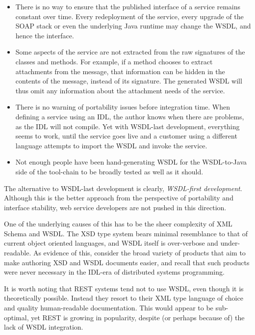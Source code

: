 \begin{itemize}

\item
    There is no way to ensure that the published interface of a service
    remains constant over time. Every redeployment of the service, every
    upgrade of the SOAP stack or even the underlying Java runtime may
    change the WSDL, and hence the interface.

\item

Some aspects of the service are not extracted from the raw signatures
of the classes and methods. For example, if a method chooses to extract
attachments from the message, that information can be hidden in the contents
of the message, instead of its signature. The generated WSDL will thus
omit any information about the attachment needs of the service.

\item

There is no warning of portability issues before integration time. 
When defining a service using an IDL, the author knows
when there are problems, as the IDL will not compile. Yet with WSDL-last
development, everything seems to work, until the service goes live and
a customer using a different language attempts to import the WSDL and
invoke the service.

\item

Not enough people have been hand-generating WSDL for the WSDL-to-Java
side of the tool-chain to be broadly tested as well as it should.

    
\end{itemize}

The alternative to WSDL-last development is clearly, \emph{WSDL-first
development}. Although this is the better approach from the perspective
of portability and interface stability, web service developers are not
pushed in this direction.

One of the underlying causes of this has to be the sheer complexity of
XML Schema and WSDL. The XSD type system bears minimal resemblance to
that of current object oriented languages, and WSDL itself is
over-verbose and under-readable. As evidence of this, consider the
broad variety of products that aim to make authoring XSD and WSDL
documents easier, and recall that such products were never necessary
in the IDL-era of distributed systems programming.

It is worth noting that REST systems \cite{fielding:rest} tend not to
use WSDL, even though it is theoretically possible. Instead they
resort to their XML type language of choice and quality human-readable
documentation. This would appear to be sub-optimal, yet REST is
growing in popularity, despite (or perhaps because of) the lack of
WSDL integration.

